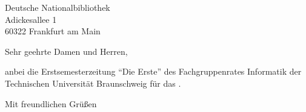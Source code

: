 \documentclass[%
  nexus,%
  mono,%
  10pt%
]{tubslttr2}
\begin{document}
\begin{letter}{%
  Deutsche Nationalbibliothek\\
  Adickesallee 1\\
  60322 Frankfurt am Main 
}
\opening{Sehr geehrte Damen und Herren,}

anbei die Erstsemesterzeitung \enquote{Die Erste} des Fachgruppenrates Informatik der Technischen Universität Braunschweig für das \iftoggle{winter}{Wintersemester}{Sommersemester} \the\year.

\closing{Mit freundlichen Grüßen}

\end{letter}
\end{document}
